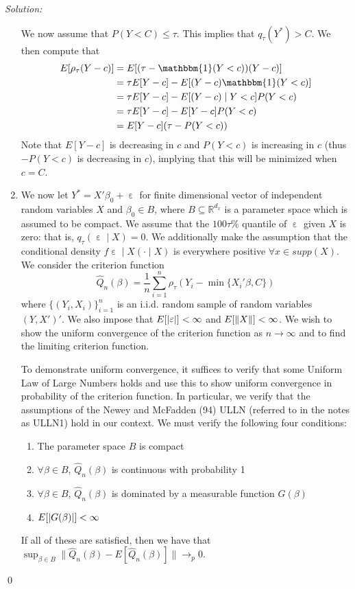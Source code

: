\documentclass[12pt]{article}
\DeclarePairedDelimiter\norm{\lVert}{\rVert}%
\DeclareMathOperator{\eps}{\varepsilon}
\DeclarePairedDelimiter\abs{\lvert}{\rvert}%
\newenvironment{sol}
    {\emph{Solution:}
    }
    {
    \qed
    }
\begin{document}
\begin{sol}
\begin{enumerate}[label=\alph*) ]
    We now assume that $P(Y < C) \leq \tau$. This implies that $q_{\tau}(Y^*) > C$. We then compute that
    \begin{align*}
        E[\rho_{\tau}(Y - c)] &= E[(\tau - \mathbbm{1}(Y < c))(Y-c)]\\
        &= \tau E[Y - c] - E[(Y-c) \mathbbm{1}(Y < c)]\\
        &= \tau E[Y -c] - E[(Y - c ) \mid Y < c] P(Y < c)\\
        &= \tau E[Y - c] - E[Y - c] P(Y < c)\\
        &= E[Y - c] (\tau - P(Y < c))
    \end{align*}
    Note that $E[Y - c]$ is decreasing in $c$ and $P(Y < c)$ is increasing in $c$ (thus $- P(Y < c)$ is decreasing in $c$), implying that this will be minimized when $c = C$.
    \item We now let $Y^* = X'\beta_0 + \eps$ for finite dimensional vector of independent random variables $X$ and $\beta_0 \in B$, where $B \subseteq \mathbb{R}^{d_x}$ is a parameter space which is assumed to be compact. We assume that the $100\tau\%$ quantile of $\eps$ given $X$ is zero: that is, $q_{\tau}(\eps \mid X) = 0$. We additionally make the assumption that the conditional density $f{\eps \mid X}(\cdot \mid X) $ is everywhere positive $\forall x \in supp(X)$. We consider the criterion function
    \[\hat{Q}_n(\beta) = \frac{1}{n} \sum_{i=1}^n \rho_{\tau}(Y_i - \min\{X_i'\beta, C\})\]
    where $\{(Y_i, X_i)\}_{i=1}^n$ is an i.i.d. random sample of random variables $(Y, X')'$. We also impose that $E[\abs{\eps}] < \infty$ and $E[\norm{X}] < \infty$. We wish to show the uniform convergence of the criterion function as $n \rightarrow \infty$ and to find the limiting criterion function.

    To demonstrate uniform convergence, it suffices to verify that some Uniform Law of Large Numbers holds and use this to show uniform convergence in probability of the criterion function. In particular, we verify that the assumptions of the Newey and McFadden (94) ULLN (referred to in the notes as ULLN1) hold in our context. We must verify the following four conditions:
    \begin{enumerate} \item The parameter space $B$ is compact
        \item $\forall \beta \in B$, $\hat{Q}_n(\beta)$ is continuous with probability 1
        \item $\forall \beta \in B$, $\hat{Q}_n(\beta)$ is dominated by a measurable function $G(\beta)$ 
        \item $ E[\abs{G(\beta)}] < \infty$
    \end{enumerate}
    If all of these are satisfied, then we have that $\sup_{\beta \in B}\lVert \hat{Q}_n(\beta) - E[\hat{Q}_n(\beta)]\rVert \rightarrow_p 0$. 


\end{enumerate}
\end{sol}
\end{document}
